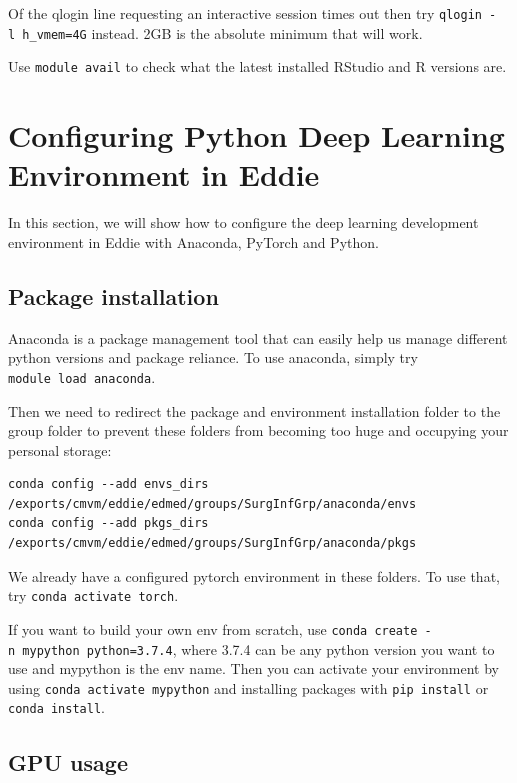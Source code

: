 \documentclass[
]{book}
\begin{document}
Of the qlogin line requesting an interactive session times out then try \texttt{qlogin\ -l\ h\_vmem=4G} instead. 2GB is the absolute minimum that will work.

Use \texttt{module\ avail} to check what the latest installed RStudio and R versions are.

\hypertarget{configuring-python-deep-learning-environment-in-eddie}{%
\section{Configuring Python Deep Learning Environment in Eddie}\label{configuring-python-deep-learning-environment-in-eddie}}

In this section, we will show how to configure the deep learning development environment in Eddie with Anaconda, PyTorch and Python.

\hypertarget{package-installation}{%
\subsection{Package installation}\label{package-installation}}

Anaconda is a package management tool that can easily help us manage different python versions and package reliance. To use anaconda, simply try \texttt{module\ load\ anaconda}.

Then we need to redirect the package and environment installation folder to the group folder to prevent these folders from becoming too huge and occupying your personal storage:

\begin{verbatim}
conda config --add envs_dirs /exports/cmvm/eddie/edmed/groups/SurgInfGrp/anaconda/envs
conda config --add pkgs_dirs /exports/cmvm/eddie/edmed/groups/SurgInfGrp/anaconda/pkgs
\end{verbatim}

We already have a configured pytorch environment in these folders. To use that, try \texttt{conda\ activate\ torch}.

If you want to build your own env from scratch, use \texttt{conda\ create\ -n\ mypython\ python=3.7.4}, where 3.7.4 can be any python version you want to use and mypython is the env name. Then you can activate your environment by using \texttt{conda\ activate\ mypython} and installing packages with \texttt{pip\ install} or \texttt{conda\ install}.

\hypertarget{gpu-usage}{%
\subsection{GPU usage}\label{gpu-usage}}
\end{document}
